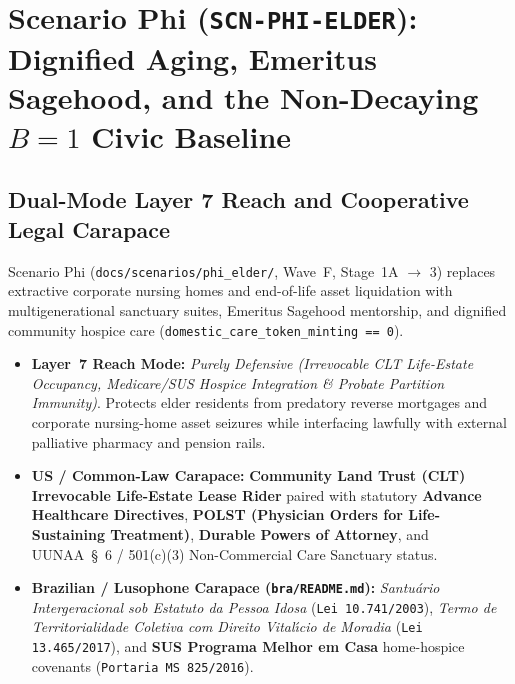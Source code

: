 \chapter{Scenario Phi (\texttt{SCN-PHI-ELDER}): Dignified Aging, Emeritus Sagehood, and the Non-Decaying \texorpdfstring{$B = 1$}{B = 1} Civic Baseline}
\label{app:scenario-phi}

\section{Dual-Mode Layer 7 Reach and Cooperative Legal Carapace}
Scenario Phi (\texttt{docs/scenarios/phi\_elder/}, Wave~F, Stage~1A $\to$ 3) replaces extractive corporate nursing homes and end-of-life asset liquidation with multigenerational sanctuary suites, Emeritus Sagehood mentorship, and dignified community hospice care (\texttt{domestic\_care\_token\_minting == 0}).
\begin{itemize}
    \item \textbf{Layer~7 Reach Mode:} \textit{Purely Defensive (Irrevocable CLT Life-Estate Occupancy, Medicare/SUS Hospice Integration \& Probate Partition Immunity)}. Protects elder residents from predatory reverse mortgages and corporate nursing-home asset seizures while interfacing lawfully with external palliative pharmacy and pension rails.
    \item \textbf{US / Common-Law Carapace:} \textbf{Community Land Trust (CLT) Irrevocable Life-Estate Lease Rider} paired with statutory \textbf{Advance Healthcare Directives}, \textbf{POLST (Physician Orders for Life-Sustaining Treatment)}, \textbf{Durable Powers of Attorney}, and UUNAA~\S~6 / 501(c)(3) Non-Commercial Care Sanctuary status.
    \item \textbf{Brazilian / Lusophone Carapace (\texttt{bra/README.md}):} \textit{Santu{\'a}rio Intergeracional sob Estatuto da Pessoa Idosa} (\texttt{Lei 10.741/2003}), \textit{Termo de Territorialidade Coletiva com Direito Vital{\'\i}cio de Moradia} (\texttt{Lei 13.465/2017}), and \textbf{SUS Programa Melhor em Casa} home-hospice covenants (\texttt{Portaria MS 825/2016}).
\end{itemize}

